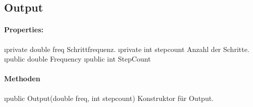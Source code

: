 \documentclass[../entwurf.tex]{subfiles}
\begin{document}
    \subsection{Output}
        \paragraph{Properties:}
        \begin{itemize}
            \i{private double freq} Schrittfrequenz.
            \i{private int stepcount} Anzahl der Schritte.
            \i{public double Frequency} 
            \i{public int StepCount} 
        \end{itemize}
        \paragraph{Methoden}
        \begin{itemize}
            \i{public Output(double freq, int stepcount)} Konstruktor für Output.
        \end{itemize}


                        
\end{document}
